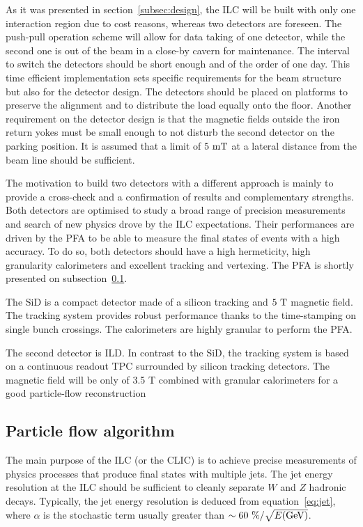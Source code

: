   As it was presented in section~\ref{subsec:design}, the \gls{ILC} will be built with only one interaction region due to cost reasons, whereas two detectors are foreseen.
  The push-pull operation scheme will allow for data taking of one detector, while the second one is out of the beam in a close-by cavern for maintenance.
  The interval to switch the detectors should be short enough and of the order of one day.
  This time efficient implementation sets specific requirements for the beam structure but also for the detector design.
  The detectors should be placed on platforms to preserve the alignment and to distribute the load equally onto the floor.
  Another requirement on the detector design is that the magnetic fields outside the iron return yokes must be small enough to not disturb the second detector on the parking position.
  It is assumed that a limit of $5~\rm{mT}$ at a lateral distance from the beam line should be sufficient.

  The motivation to build two detectors with a different approach is mainly to provide a cross-check and a confirmation of results and complementary strengths.
  Both detectors are optimised to study a broad range of precision measurements and search of new physics drove by the \gls{ILC} expectations.
  Their performances are driven by the \gls{PFA} to be able to measure the final states of events with a high accuracy.
  To do so, both detectors should have a high hermeticity, high granularity calorimeters and excellent tracking and vertexing.
  The \gls{PFA} is shortly presented on subsection~\ref{subsec:PFA}.

  The \gls{SiD} is a compact detector made of a silicon tracking and $5~\rm{T}$ magnetic field.
  The tracking system provides robust performance thanks to the time-stamping on single bunch crossings.
  The calorimeters are highly granular to perform the \gls{PFA}.

  The second detector is \gls{ILD}.
  In contrast to the \gls{SiD}, the tracking system is based on a continuous readout \gls{TPC} surrounded by silicon tracking detectors.
  The magnetic field will be only of 3.5 T combined with granular calorimeters for a good particle-flow reconstruction

    \subsection{Particle flow algorithm}
    \label{subsec:PFA}

    The main purpose of the \gls{ILC} (or the \gls{CLIC}) is to achieve precise measurements of physics processes that produce final states with multiple jets.
    The jet energy resolution at the \gls{ILC} should be sufficient to cleanly separate $W$ and $Z$ hadronic decays.
    Typically, the jet energy resolution is deduced from equation~\ref{eq:jet}, where $\alpha$ is the stochastic term usually greater than $\sim 60~\% / \sqrt{E\rm{(GeV)}}$.


